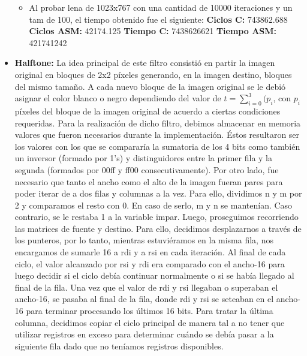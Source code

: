 \documentclass[10pt, a4paper]{article}
\begin{document}
\begin{itemize}
\begin{itemize}
\item{Al probar lena de 1023x767 con una cantidad de 10000 iteraciones y un tam de 100, el tiempo obtenido fue el siguiente:\newline
\newline
\textbf{Ciclos C:}                  743862.688\newline
\vspace{0.15cm}
\textbf{Ciclos ASM:}               42174.125\newline
\textbf{Tiempo C:}                 7438626621\newline
\textbf{Tiempo ASM:}               421741242\newline}

\end{itemize}


\item {\textbf{Halftone:}}
La idea principal de este filtro consistió en partir la imagen original en bloques de 2x2 píxeles generando, en la imagen destino, bloques del mismo tamaño. A cada nuevo bloque de la imagen original se le debió asignar el color blanco o negro dependiendo del valor de $t = \sum_{i=0}^{3} {(p_{i}}$, con $p_{i}$ píxeles del bloque de la imagen original de acuerdo a ciertas condiciones requeridas.\newline
Para la realización de dicho filtro, debimos almacenar en memoria valores que fueron necesarios durante la implementación. Éstos resultaron ser los valores con los que se compararía la sumatoria de los 4 bits como también un inversor (formado por 1's) y distinguidores entre la primer fila y la segunda (formados por 00ff y ff00 consecutivamente).\newline 
Por otro lado, fue necesario que tanto el ancho como el alto de la imagen fueran pares para poder iterar de a dos filas y columnas a la vez. Para ello, dividimos n y m por 2 y comparamos el resto con 0. En caso de serlo, m y n se mantenían. Caso contrario, se le restaba 1 a la variable impar.\newline
Luego, proseguimos recorriendo las matrices de fuente y destino. Para ello, decidimos desplazarnos a través de los punteros, por lo tanto, mientras estuviéramos en la misma fila, nos encargamos de sumarle 16 a rdi y a rsi en cada iteración. Al final de cada ciclo, el valor alcanzado por rsi y rdi era comparado con el ancho-16 para luego decidir si el ciclo debía continuar normalmente o si se había llegado al final de la fila. Una vez que el valor de rdi y rsi llegaban o superaban el ancho-16, se pasaba al final de la fila, donde rdi y rsi se seteaban en el ancho-16 para terminar procesando los últimos 16 bits. Para tratar la última columna, decidimos copiar el ciclo principal de manera tal a no tener que utilizar registros en exceso para determinar cuándo se debía pasar a la siguiente fila dado que no teníamos registros disponibles.\newline

\end{itemize}
\end{document}
